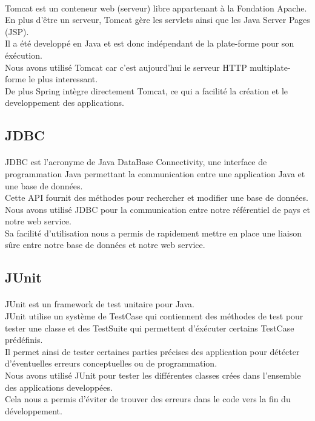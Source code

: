 \paragraph{} Tomcat est un conteneur web (serveur) libre appartenant à la Fondation Apache.\\
En plus d'être un serveur, Tomcat gère les servlets ainsi que les Java Server Pages (JSP).\\
Il a été developpé en Java et est donc indépendant de la plate-forme pour son éxécution.\\
Nous avons utilisé Tomcat car c'est aujourd'hui le serveur HTTP multiplate-forme le plus interessant.\\
De plus Spring intègre directement Tomcat, ce qui a facilité la création et le developpement des applications.\\

\subsection{JDBC}
\paragraph{} JDBC est l'acronyme de Java DataBase Connectivity, une interface de programmation Java permettant la communication entre une application Java et une base de données.\\
Cette API fournit des méthodes pour rechercher et modifier une base de données.\\
Nous avons utilisé JDBC pour la communication entre notre référentiel de pays et notre web service.\\
Sa facilité d'utilisation nous a permis de rapidement mettre en place une liaison sûre entre notre base de données et notre web service.\\

\subsection{JUnit}
\paragraph{}JUnit est un framework de test unitaire pour Java.\\
JUnit utilise un système de TestCase qui contiennent des méthodes de test pour tester une classe et des TestSuite qui permettent d'éxécuter certains TestCase prédéfinis.\\
Il permet ainsi de tester certaines parties précises des application pour détécter d'éventuelles erreurs conceptuelles ou de programmation.\\
Nous avons utilisé JUnit pour tester les différentes classes crées dans l'ensemble des applications developpées.\\
Cela nous a permis d'éviter de trouver des erreurs dans le code vers la fin du développement.\\
